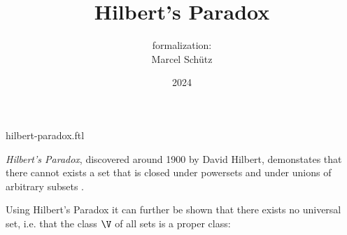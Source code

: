 \documentclass{article}
\title{Hilbert's Paradox}
\author{\Naproche formalization:\\[0.5em]Marcel Schütz}
\date{2024}
\begin{document}
\begin{smodule}{hilbert-paradox.ftl}
  \maketitle


  \noindent \emph{Hilbert's Paradox}, discovered around 1900 by David Hilbert, 
  demonstates that there cannot exists a set that is closed under powersets and 
  under unions of arbitrary subsets \cite{PeckhausKahl2002}.


  \noindent Using Hilbert's Paradox it can further be shown that there exists 
  no universal set, i.e. that the class $\V$ of all sets is a proper class:


  \printbibliography
\end{smodule}
\end{document}
